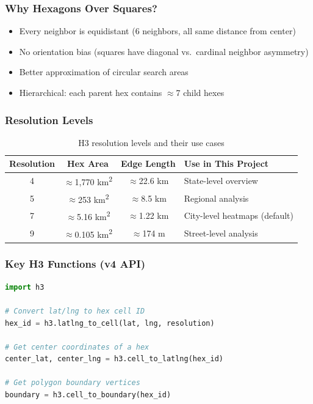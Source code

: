 \documentclass[12pt, a4paper]{article}
\begin{document}
\subsubsection{Why Hexagons Over Squares?}

\begin{itemize}[leftmargin=2em]
    \item Every neighbor is equidistant (6 neighbors, all same distance from center)
    \item No orientation bias (squares have diagonal vs.\ cardinal neighbor asymmetry)
    \item Better approximation of circular search areas
    \item Hierarchical: each parent hex contains $\approx$7 child hexes
\end{itemize}

\subsubsection{Resolution Levels}

\begin{table}[H]
\centering
\begin{tabularx}{\textwidth}{c c c X}
    \toprule
    \textbf{Resolution} & \textbf{Hex Area} & \textbf{Edge Length} & \textbf{Use in This Project} \\
    \midrule
    4 & $\approx$1,770 km\textsuperscript{2} & $\approx$22.6 km & State-level overview \\
    5 & $\approx$253 km\textsuperscript{2}   & $\approx$8.5 km  & Regional analysis \\
    7 & $\approx$5.16 km\textsuperscript{2}  & $\approx$1.22 km & City-level heatmaps (default) \\
    9 & $\approx$0.105 km\textsuperscript{2} & $\approx$174 m   & Street-level analysis \\
    \bottomrule
\end{tabularx}
\caption{H3 resolution levels and their use cases}
\end{table}

\subsubsection{Key H3 Functions (v4 API)}

\begin{lstlisting}[language=Python]
import h3

# Convert lat/lng to hex cell ID
hex_id = h3.latlng_to_cell(lat, lng, resolution)

# Get center coordinates of a hex
center_lat, center_lng = h3.cell_to_latlng(hex_id)

# Get polygon boundary vertices
boundary = h3.cell_to_boundary(hex_id)
\end{lstlisting}
\end{document}
